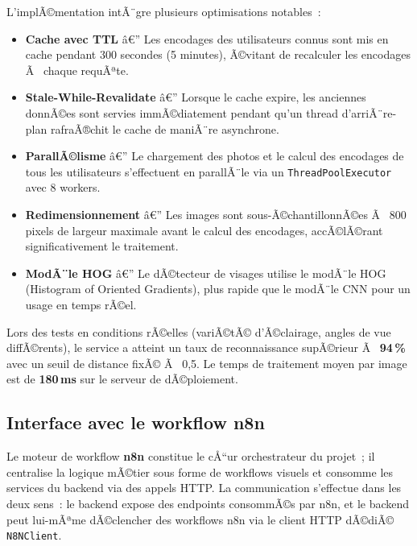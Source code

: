 L'implÃ©mentation intÃ¨gre plusieurs optimisations notables~:

\begin{itemize}[noitemsep]
  \item \textbf{Cache avec TTL} â€” Les encodages des utilisateurs
    connus sont mis en cache pendant 300 secondes (5 minutes),
    Ã©vitant de recalculer les encodages Ã  chaque requÃªte.
  \item \textbf{Stale-While-Revalidate} â€” Lorsque le cache expire,
    les anciennes donnÃ©es sont servies immÃ©diatement pendant qu'un
    thread d'arriÃ¨re-plan rafraÃ®chit le cache de maniÃ¨re asynchrone.
  \item \textbf{ParallÃ©lisme} â€” Le chargement des photos et le
    calcul des encodages de tous les utilisateurs s'effectuent en
    parallÃ¨le via un \texttt{ThreadPoolExecutor} avec 8 workers.
  \item \textbf{Redimensionnement} â€” Les images sont
    sous-Ã©chantillonnÃ©es Ã  800 pixels de largeur maximale avant
    le calcul des encodages, accÃ©lÃ©rant significativement le
    traitement.
  \item \textbf{ModÃ¨le HOG} â€” Le dÃ©tecteur de visages utilise le
    modÃ¨le HOG (Histogram of Oriented Gradients), plus rapide que
    le modÃ¨le CNN pour un usage en temps rÃ©el.
\end{itemize}

\begin{tcolorbox}[colback=green!5!white, colframe=green!50!black,
  title=\textbf{PrÃ©cision du systÃ¨me de reconnaissance}]
Lors des tests en conditions rÃ©elles (variÃ©tÃ© d'Ã©clairage, angles
de vue diffÃ©rents), le service a atteint un taux de reconnaissance
supÃ©rieur Ã  \textbf{94\,\%} avec un seuil de distance fixÃ© Ã  0,5.
Le temps de traitement moyen par image est de \textbf{180\,ms}
sur le serveur de dÃ©ploiement.
\end{tcolorbox}

\subsection{Interface avec le workflow n8n}

Le moteur de workflow \textbf{n8n} constitue le cÅ“ur
orchestrateur du projet~; il centralise la logique mÃ©tier sous
forme de workflows visuels et consomme les services du backend
via des appels HTTP. La communication s'effectue dans les deux
sens~: le backend expose des endpoints consommÃ©s par n8n, et
le backend peut lui-mÃªme dÃ©clencher des workflows n8n via le
client HTTP dÃ©diÃ© \texttt{N8NClient}.

